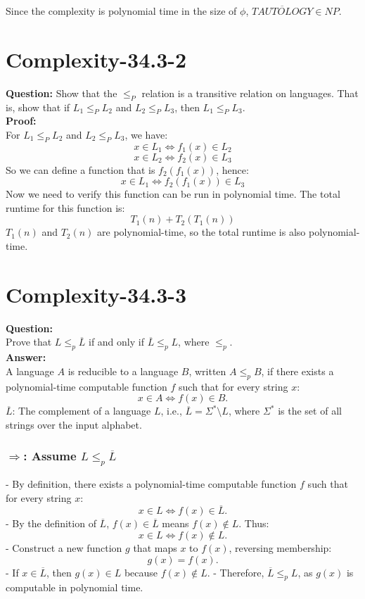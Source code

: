 \documentclass[12pt]{article}
\begin{document}
Since the complexity is polynomial time in the size of $\phi$, $\overline{TAUTOLOGY} \in NP$.

\section{Complexity-34.3-2}
\textbf{Question:} Show that the \(\leq_P\) relation is a transitive relation on languages. That is, show that if \(L_1 \leq_PL_2 \) and \(L_2\leq_P L_3\), then \(L_1\leq_P L_3\). \\
\textbf{Proof:}\\
For \(L_1 \leq_PL_2 \) and \(L_2\leq_P L_3\), we have:
\[x \in L_1 \iff f_1(x) \in L_2\]
\[x \in L_2 \iff f_2(x) \in L_3\]
So we can define a function that is \(f_2(f_1(x))\), hence:
\[x \in L_1 \iff f_2(f_1(x)) \in L_3\]
Now we need to verify this function can be run in polynomial time.
The total runtime for this function is:
\[T_1(n)+T_2(T_1(n))\]
\(T_1(n)\) and \(T_2(n)\) are polynomial-time, so the total runtime is also polynomial-time.
\section{Complexity-34.3-3}
\textbf{Question:}\\
Prove that \( L \leq_p \overline{L} \) if and only if \( \overline{L} \leq_p L \), where \( \leq_p \).\\
\textbf{Answer:}\\
A language \( A \) is reducible to a language \( B \), written \( A \leq_p B \), if there exists a polynomial-time computable function \( f \) such that for every string \( x \):
   \[
   x \in A \iff f(x) \in B.
   \]
\( \overline{L} \): The complement of a language \( L \), i.e., \( \overline{L} = \Sigma^* \setminus L \), where \( \Sigma^* \) is the set of all strings over the input alphabet.

\subsubsection*{\( \Rightarrow \): Assume \( L \leq_p \overline{L} \)}
- By definition, there exists a polynomial-time computable function \( f \) such that for every string \( x \):
  \[
  x \in L \iff f(x) \in \overline{L}.
  \]
- By the definition of \( \overline{L} \), \( f(x) \in \overline{L} \) means \( f(x) \notin L \). Thus:
  \[
  x \in L \iff f(x) \notin L.
  \]
- Construct a new function \( g \) that maps \( x \) to \( f(x) \), reversing membership:
  \[
  g(x) = f(x).
  \]
  - If \( x \in \overline{L} \), then \( g(x) \in L \) because \( f(x) \notin L \).
  - Therefore, \( \overline{L} \leq_p L \), as \( g(x) \) is computable in polynomial time.
\end{document}
